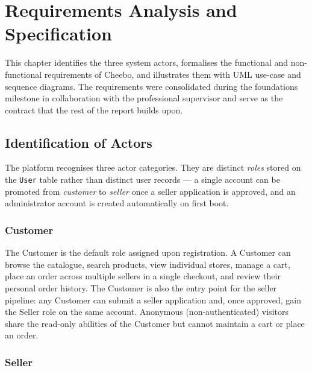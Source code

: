 \documentclass[12pt, a4paper, oneside]{report}
\newenvironment{chapterintro}{%
  \begin{mdframed}[backgroundcolor=cheebolightgray,linecolor=cheeboblue,linewidth=1pt]
  \small\itshape
}{%
  \end{mdframed}
}
\begin{document}
\chapter{Requirements Analysis and Specification}
\label{chap:requirements}

\begin{chapterintro}
  This chapter identifies the three system actors, formalises the
  functional and non-functional requirements of Cheebo, and illustrates
  them with UML use-case and sequence diagrams. The requirements were
  consolidated during the foundations milestone in collaboration with the
  professional supervisor and serve as the contract that the rest of
  the report builds upon.
\end{chapterintro}

\section{Identification of Actors}

The platform recognises three actor categories. They are distinct
\textit{roles} stored on the \texttt{User} table rather than
distinct user records --- a single account can be promoted from
\textit{customer} to \textit{seller} once a seller application is
approved, and an administrator account is created automatically on
first boot.

\subsection{Customer}

The Customer is the default role assigned upon registration. A
Customer can browse the catalogue, search products, view individual
stores, manage a cart, place an order across multiple sellers in a
single checkout, and review their personal order history. The
Customer is also the entry point for the seller pipeline: any
Customer can submit a seller application and, once approved, gain
the Seller role on the same account. Anonymous (non-authenticated)
visitors share the read-only abilities of the Customer but cannot
maintain a cart or place an order.

\subsection{Seller}
\end{document}

